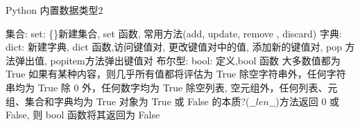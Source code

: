 \begin{frame}{Python 内置数据类型2}
    \begin{myoutline}
        \1 集合: set: 
            \2 \{\}新建集合, set 函数, 常用方法(add, update, remove , discard)
        \1 字典: dict: 
            新建字典, dict 函数,访问键值对, 更改键值对中的值, 添加新的键值对, pop 方法弹出值, popitem方法弹出键值对
        \1 布尔型: bool: 
            \2 定义,bool 函数
            \2 大多数值都为 True
                \3 如果有某种内容，则几乎所有值都将评估为 True
                \3 除空字符串外，任何字符串均为 True
                \3 除 0 外，任何数字均为 True
                \3 除空列表, 空元组外，任何列表、元组、集合和字典均为 True
                \3 对象为 True 或 False 的本质?($\_\_len\_\_$)方法返回 0 或 False, 则 bool 函数将其返回为 False
    \end{myoutline}
\end{frame}
